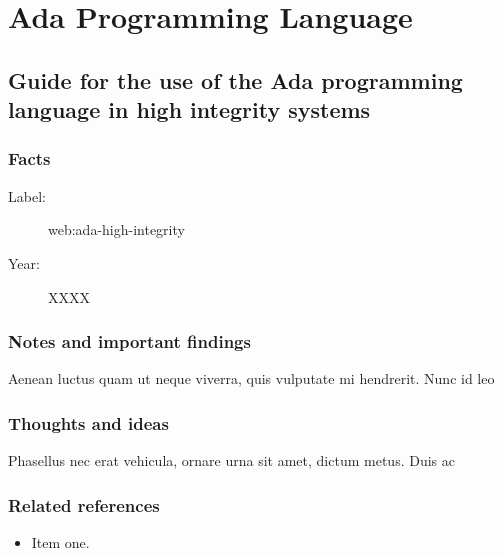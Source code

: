 \chapter{Ada Programming Language}

\section{Guide for the use of the Ada programming language in high integrity
systems}

\subsection{Facts}
\begin{description}
    \item[Label:] web:ada-high-integrity \cite{web:ada-high-integrity}
    \item[Year:] XXXX
\end{description}

\subsection{Notes and important findings}
Aenean luctus quam ut neque viverra, quis vulputate mi hendrerit. Nunc id leo

\subsection{Thoughts and ideas}
Phasellus nec erat vehicula, ornare urna sit amet, dictum metus. Duis ac

\subsection{Related references}
\begin{itemize}
    \item Item one.
\end{itemize}
